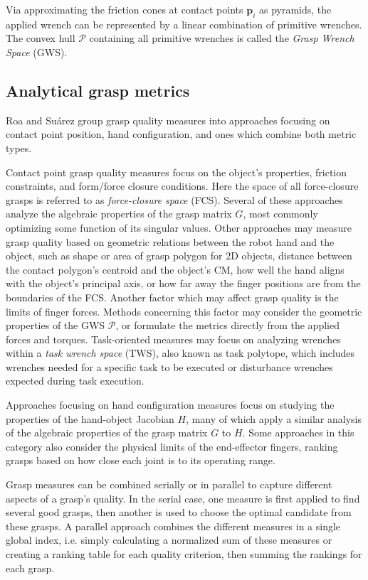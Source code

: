 Via approximating the friction cones at contact points $ \boldsymbol{p}_i $ as pyramids, the applied wrench can be
represented by a linear combination of primitive wrenches. The convex hull $ \mathcal{P} $ containing all primitive
wrenches is called the \emph{Grasp Wrench Space} (GWS).

\subsection{Analytical grasp metrics}

Roa and Su{\'a}rez \cite{Roa2015} group grasp quality measures into approaches focusing on contact point position, hand
configuration, and ones which combine both metric types.

Contact point grasp quality measures focus on the object's properties, friction constraints, and form/force closure
conditions. Here the space of all force-closure grasps is referred to as \emph{force-closure space} (FCS). Several of
these approaches analyze the algebraic properties of the grasp matrix $ G $, most commonly optimizing some function of
its singular values. Other approaches may measure grasp quality based on geometric relations between the robot hand and
the object, such as shape or area of grasp polygon for 2D objects, distance between the contact polygon's centroid and
the object's CM, how well the hand aligns with the object's principal axis, or how far away the finger positions are
from the boundaries of the FCS. Another factor which may affect grasp quality is the limits of finger forces. Methods
concerning this factor may consider the geometric properties of the GWS $ \mathcal{P} $, or formulate the metrics
directly from the applied forces and torques. Task-oriented measures may focus on analyzing wrenches within a
\emph{task wrench space} (TWS), also known as task polytope, which includes wrenches needed for a specific task to be
executed or disturbance wrenches expected during task execution.

Approaches focusing on hand configuration measures focus on studying the properties of the hand-object Jacobian $H$,
many of which apply a similar analysis of the algebraic properties of the grasp matrix $ G $ to $ H $. Some approaches
in this category also consider the physical limits of the end-effector fingers, ranking grasps based on how close each
joint is to its operating range.

Grasp measures can be combined serially or in parallel to capture different aspects of a grasp's quality. In the serial
case, one measure is first applied to find several good grasps, then another is used to choose the optimal candidate
from these grasps. A parallel approach combines the different measures in a single global index, i.e. simply calculating
a normalized sum of these measures or creating a ranking table for each quality criterion, then summing the rankings
for each grasp.

